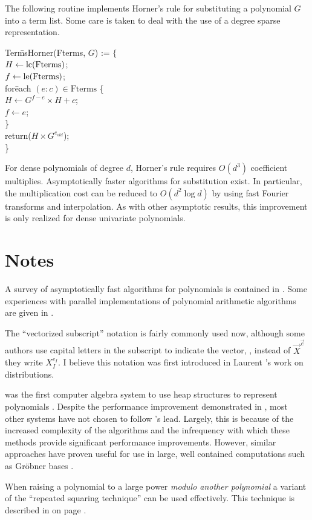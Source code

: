 The following routine implements Horner's rule for substituting a
polynomial $G$ into a term list.  Some care is taken to deal with the
use of a degree sparse representation. 

\begindsacode
Ter\=msHorner(Fterms, $G$) := $\{$ \\
\> $H \leftarrow \operatorname{lc}(\mbox{Fterms})$; \\
\> $f \leftarrow \operatorname{le}(\mbox{Fterms})$; \\
\> for\=each $(e : c) \in \mbox{Fterms}$ \{ \\
\>\> $H \leftarrow G^{f - e} \times H + c$; \\
\>\> $f \leftarrow e$; \\
\>\> \} \\
\> return($H \times G^{e_{old}}$); \\
\> \}
\enddsacode

For dense polynomials of degree $d$, Horner's rule requires $O(d^3)$
coefficient multiplies.  Asymptotically faster algorithms for
substitution exist.  In particular, the multiplication cost can be
reduced to $O(d^2 \log d)$ by using fast Fourier transforms and
interpolation.  As with other asymptotic results, this improvement is
only realized for dense univariate polynomials.

\section*{Notes}

\small

A survey of asymptotically fast algorithms for polynomials is
contained in \cite{Pan1992-dl}.  Some experiences with parallel
implementations of polynomial arithmetic algorithms are given in
\cite{Ponder1991-zd, Silverman1990-hp}. 

 The ``vectorized subscript''
notation is fairly commonly used now, although some authors use
capital letters in the subscript to indicate the vector, \ie, instead
of $\vec{X}^{\vec{e}}$ they write $X_I^{e_I}$.  I believe this
notation was first introduced in Laurent {\SchwartzL}'s work on
distributions.

 {\Altran} was the first computer algebra
system to use heap structures to represent polynomials
\cite{Brown1973-gv}.  Despite the performance improvement demonstrated
in {\Altran} \cite{Sundblad1973-wi}, most other systems have not chosen to
follow {\Altran}'s lead.  Largely, this is because of the increased
complexity of the algorithms and the infrequency with which these
methods provide significant performance improvements.  However,
similar approaches have proven useful for use in large, well contained
computations such as Gr\"{o}bner bases \cite{TYan}.

 When raising a polynomial to a large
power {\em modulo another polynomial} a variant of the ``repeated
squaring technique'' can be used effectively.  This technique is
described in  on page
\pageref{FFac:Distinct:Sec}.

\normalsize


